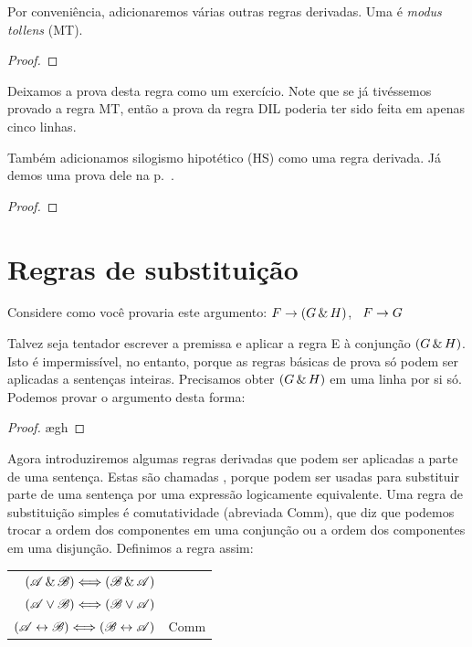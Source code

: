 Por conveniência, adicionaremos várias outras regras derivadas. Uma é \emph{modus tollens} (MT).

\begin{proof}
	 
\end{proof}

Deixamos a prova desta regra como um exercício. Note que se já tivéssemos provado a regra MT, então a prova da regra DIL poderia ter sido feita em apenas cinco linhas.

Também adicionamos silogismo hipotético (HS) como uma regra derivada. Já demos uma prova dele na p.~\pageref{HSproof}.

\begin{proof}
\end{proof}


\section{Regras de substituição}
Considere como você provaria este argumento: $F\rightarrow(G\,\&\, H)$, \therefore\ $F\rightarrow G$

Talvez seja tentador escrever a premissa e aplicar a regra {\eand}E à conjunção $(G \,\&\, H)$. Isto é impermissível, no entanto, porque as regras básicas de prova só podem ser aplicadas a sentenças inteiras. Precisamos obter $(G \,\&\, H)$ em uma linha por si só. Podemos provar o argumento desta forma:

\begin{proof}
	\open
		\ae{gh}
	\close
\end{proof}

Agora introduziremos algumas regras derivadas que podem ser aplicadas a parte de uma sentença. Estas são chamadas , porque podem ser usadas para substituir parte de uma sentença por uma expressão logicamente equivalente. Uma regra de substituição simples é comutatividade (abreviada Comm), que diz que podemos trocar a ordem dos componentes em uma conjunção ou a ordem dos componentes em uma disjunção. Definimos a regra assim:

\begin{center}
\begin{tabular}{rl}
$(\mathscr{A}\,\&\,\mathscr{B}) \Longleftrightarrow (\mathscr{B}\,\&\,\mathscr{A})$\\
$(\mathscr{A}\vee\mathscr{B}) \Longleftrightarrow (\mathscr{B}\vee\mathscr{A})$\\
$(\mathscr{A}\leftrightarrow\mathscr{B}) \Longleftrightarrow (\mathscr{B}\leftrightarrow\mathscr{A})$
& Comm
\end{tabular}
\end{center}


